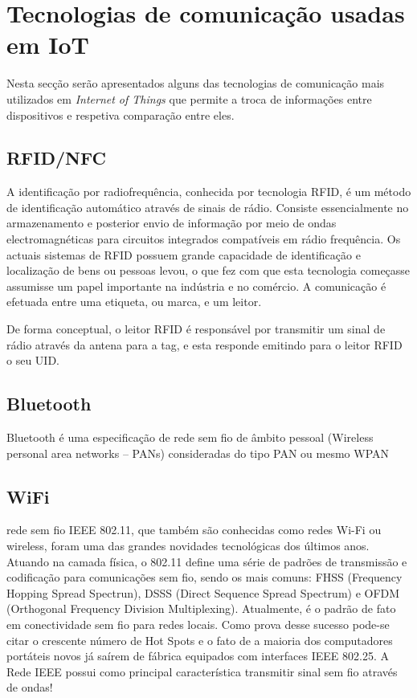 \newpage


\section{Tecnologias de comunicação usadas em \ac{IoT}}

Nesta secção serão apresentados alguns das tecnologias de comunicação mais utilizados em \textit{Internet of Things} que permite a troca de informações entre dispositivos e respetiva comparação entre eles. 



\subsection{RFID/NFC}

A identificação por radiofrequência, conhecida por tecnologia \ac{RFID}, é um método de identificação automático através de sinais de rádio. Consiste essencialmente no armazenamento e posterior envio de informação por meio de ondas electromagnéticas para circuitos integrados compatíveis em rádio frequência.  
Os actuais sistemas de \ac{RFID} possuem grande capacidade de identificação e localização de bens ou pessoas levou, o que fez com que esta tecnologia começasse assumisse um papel importante na indústria e no comércio. A comunicação é efetuada entre uma etiqueta, ou marca, e um leitor.


De forma conceptual, o leitor \ac{RFID} é responsável por transmitir um sinal de rádio através da antena para a tag, e esta responde emitindo para o leitor \ac{RFID} o seu \ac{UID}.


\subsection{Bluetooth}

Bluetooth é uma especificação de rede sem fio de âmbito pessoal (Wireless personal area networks – PANs) consideradas do tipo PAN ou mesmo WPAN


\subsection{WiFi}

rede sem fio IEEE 802.11, que também são conhecidas como redes Wi-Fi ou wireless, foram uma das grandes novidades tecnológicas dos últimos anos. Atuando na camada física, o 802.11 define uma série de padrões de transmissão e codificação para comunicações sem fio, sendo os mais comuns: FHSS (Frequency Hopping Spread Spectrun), DSSS (Direct Sequence Spread Spectrum) e OFDM (Orthogonal Frequency Division Multiplexing). Atualmente, é o padrão de fato em conectividade sem fio para redes locais. Como prova desse sucesso pode-se citar o crescente número de Hot Spots e o fato de a maioria dos computadores portáteis novos já saírem de fábrica equipados com interfaces IEEE 802.25. A Rede IEEE possui como principal característica transmitir sinal sem fio através de ondas!



